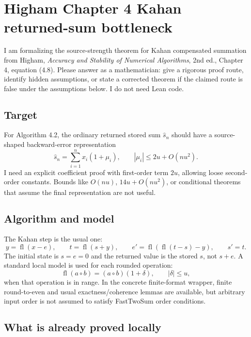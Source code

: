 \documentclass{article}
\begin{document}
\section*{Higham Chapter 4 Kahan returned-sum bottleneck}

I am formalizing the source-strength theorem for Kahan compensated summation
from Higham, \emph{Accuracy and Stability of Numerical Algorithms}, 2nd ed.,
Chapter 4, equation (4.8).  Please answer as a mathematician: give a rigorous
proof route, identify hidden assumptions, or state a corrected theorem if the
claimed route is false under the assumptions below.  I do not need Lean code.

\subsection*{Target}

For Algorithm 4.2, the ordinary returned stored sum $\widehat{s}_n$ should have
a source-shaped backward-error representation
\[
  \widehat{s}_n=\sum_{i=1}^n x_i(1+\mu_i),
  \qquad |\mu_i|\le 2u+O(nu^2).
\]
I need an explicit coefficient proof with first-order term $2u$, allowing loose
second-order constants.  Bounds like $O(nu)$, $14u+O(nu^2)$, or conditional
theorems that assume the final representation are not useful.

\subsection*{Algorithm and model}

The Kahan step is the usual one:
\[
  y=\operatorname{fl}(x-e),\qquad
  t=\operatorname{fl}(s+y),\qquad
  e'=\operatorname{fl}(\operatorname{fl}(t-s)-y),\qquad
  s'=t.
\]
The initial state is $s=e=0$ and the returned value is the stored $s$, not
$s+e$.  A standard local model is used for each rounded operation:
\[
  \operatorname{fl}(a\circ b)=(a\circ b)(1+\delta),\qquad |\delta|\le u,
\]
when that operation is in range.  In the concrete finite-format wrapper, finite
round-to-even and usual exactness/coherence lemmas are available, but arbitrary
input order is not assumed to satisfy FastTwoSum order conditions.

\subsection*{What is already proved locally}
\end{document}
